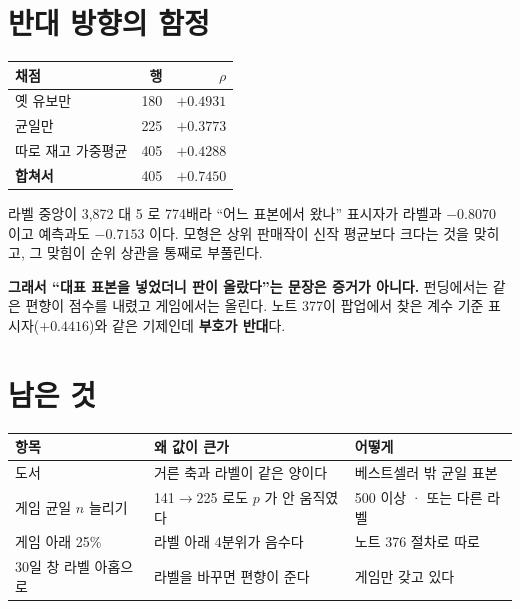 \documentclass[11pt]{article}
\begin{document}
\section{반대 방향의 함정}

\begin{center}
\begin{tabular}{lrr}
\hline
채점 & 행 & $\rho$ \\
\hline
옛 유보만 & 180 & $+0.4931$ \\
균일만 & 225 & $+0.3773$ \\
따로 재고 가중평균 & 405 & $+0.4288$ \\
\textbf{합쳐서} & 405 & $\mathbf{+0.7450}$ \\
\hline
\end{tabular}
\end{center}

라벨 중앙이 3,872 대 5 로 774배라 ``어느 표본에서 왔나'' 표시자가
라벨과 $-0.8070$ 이고 예측과도 $-0.7153$ 이다. 모형은 상위 판매작이 신작
평균보다 크다는 것을 맞히고, 그 맞힘이 순위 상관을 통째로 부풀린다.

\textbf{그래서 ``대표 표본을 넣었더니 판이 올랐다''는 문장은 증거가
아니다.} 펀딩에서는 같은 편향이 점수를 내렸고 게임에서는 올린다. 노트
377이 팝업에서 찾은 계수 기준 표시자($+0.4416$)와 같은 기제인데
\textbf{부호가 반대}다.

\section{남은 것}

\begin{center}
\begin{tabular}{lll}
\hline
항목 & 왜 값이 큰가 & 어떻게 \\
\hline
도서 & 거른 축과 라벨이 같은 양이다 & 베스트셀러 밖 균일 표본 \\
게임 균일 $n$ 늘리기 & 141$\to$225 로도 $p$ 가 안 움직였다 & 500 이상 · 또는 다른 라벨 \\
게임 아래 25\% & 라벨 아래 4분위가 음수다 & 노트 376 절차로 따로 \\
30일 창 라벨 아홉으로 & 라벨을 바꾸면 편향이 준다 & 게임만 갖고 있다 \\
\hline
\end{tabular}
\end{center}
\end{document}
